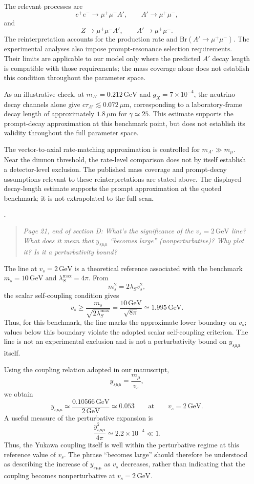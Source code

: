 \documentclass[12pt,a4paper]{article}
\begin{document}
The relevant processes are
\[
e^+e^-\to\mu^+\mu^-A',
\qquad A'\to\mu^+\mu^-,
\]
and
\[
Z\to\mu^+\mu^-A',
\qquad A'\to\mu^+\mu^-.
\]
The reinterpretation accounts for the production rate and \(\mathrm{Br}(A'\to\mu^+\mu^-)\). The experimental analyses also impose prompt-resonance selection requirements. Their limits are applicable to our model only where the predicted \(A'\) decay length is compatible with those requirements; the mass coverage alone does not establish this condition throughout the parameter space.

As an illustrative check, at \(m_{A'}=0.212\,\mathrm{GeV}\) and \(g_X=7\times10^{-4}\), the neutrino decay channels alone give \(c\tau_{A'}\lesssim0.072\,\mu\mathrm{m}\), corresponding to a laboratory-frame decay length of approximately \(1.8\,\mu\mathrm{m}\) for \(\gamma\simeq25\). This estimate supports the prompt-decay approximation at this benchmark point, but does not establish its validity throughout the full parameter space.

The vector-to-axial rate-matching approximation is controlled for \(m_{A'}\gg m_\mu\). Near the dimuon threshold, the rate-level comparison does not by itself establish a detector-level exclusion. The published mass coverage and prompt-decay assumptions relevant to these reinterpretations are stated above. The displayed decay-length estimate supports the prompt approximation at the quoted benchmark; it is not extrapolated to the full scan.

\medskip
{}. \begin{quote}\itshape
Page 21, end of section D: What's the significance of the \(v_s=2\,\mathrm{GeV}\) line? What does it mean that \(y_{s\mu\mu}\) ``becomes large'' (nonperturbative)? Why plot it? Is it a perturbativity bound?
\end{quote}

The line at \(v_s=2\,\mathrm{GeV}\) is a theoretical reference associated with the benchmark \(m_s=10\,\mathrm{GeV}\) and \(\lambda_S^{\max}=4\pi\). From
\[
m_s^2=2\lambda_Sv_s^2,
\]
the scalar self-coupling condition gives
\[
v_s\geq\frac{m_s}{\sqrt{2\lambda_S^{\max}}}
=\frac{10\,\mathrm{GeV}}{\sqrt{8\pi}}
\simeq1.995\,\mathrm{GeV}.
\]
Thus, for this benchmark, the line marks the approximate lower boundary on \(v_s\); values below this boundary violate the adopted scalar self-coupling criterion. The line is not an experimental exclusion and is not a perturbativity bound on \(y_{s\mu\mu}\) itself.

Using the coupling relation adopted in our manuscript,
\[
y_{s\mu\mu}=\frac{m_\mu}{v_s},
\]
we obtain
\[
y_{s\mu\mu}\simeq
\frac{0.10566\,\mathrm{GeV}}{2\,\mathrm{GeV}}
\simeq0.053
\qquad\text{at}\qquad v_s=2\,\mathrm{GeV}.
\]
A useful measure of the perturbative expansion is
\[
\frac{y_{s\mu\mu}^2}{4\pi}
\simeq2.2\times10^{-4}\ll1.
\]
Thus, the Yukawa coupling itself is well within the perturbative regime at this reference value of \(v_s\). The phrase ``becomes large'' should therefore be understood as describing the increase of \(y_{s\mu\mu}\) as \(v_s\) decreases, rather than indicating that the coupling becomes nonperturbative at \(v_s=2\,\mathrm{GeV}\).
\end{document}
